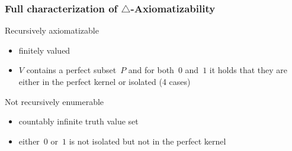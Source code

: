 \documentclass[aspectratio=169]%
  {beamer}
\newcommand{\cutin}[1]{%
\frame[c]{\begin{center}{\Large\bf\color{blue}#1}\end{center}}}
\newcommand\bd{\bigtriangleup} %
\begin{document}
\begin{frame}
  \frametitle{Full characterization of $\bd$-Axiomatizability}

  \begin{block}{Recursively axiomatizable}
    \begin{itemize}
    \item finitely valued
    \item $V$ contains a perfect subset~$P$ and for both~$0$ and~$1$
      it holds that they are either in the perfect kernel or isolated
      (4 cases)
    \end{itemize}
  \end{block}

  \pause
  \begin{block}{Not recursively enumerable}
    \begin{itemize}
    \item countably infinite truth value set
    \item either~$0$ or~$1$ is not isolated but not in the perfect kernel
    \end{itemize}
  \end{block}

\end{frame}

\end{document}
